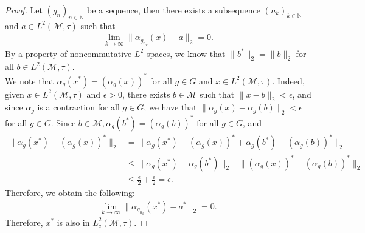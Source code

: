 \documentclass[11pt]{amsart}
\theoremstyle{definition}
\theoremstyle{myremark}
\numberwithin{equation}{section}
\newcommand{\CM}{\mathcal{M}}
\begin{document}
\begin{proof}
Let $(g_{n})_{n\in \mathbb{N}}$ be a sequence, then there exists a subsequence $(n_k)_{k\in \mathbb{N}}$ and $a\in L^{2}(\mathcal{M},\tau)$ such that 
\begin{align*}
    \lim_{k \rightarrow \infty}\|\alpha_{g_{n_k}}(x)-a\|_{2}=0.
\end{align*}
By a property of noncommutative $L^{2}$-spaces, we know that $\|b^{*}\|_{2}=\|b\|_{2}$ for all $b \in L^{2}(\mathcal{M},\tau)$.\\
We note that $\alpha_{g}(x^{*})=(\alpha_{g}(x))^{*}$ for all $g \in G \text{ and } x\in L^{2}(\CM,\tau)$. Indeed, given $x \in L^{2}(\mathcal{M},\tau)$ and $\epsilon > 0$, there exists $b \in \CM$ such that $\|x-b\|_{2}<\epsilon$, and since $\alpha_{g}$ is a contraction for all $g \in G$, we have that $\|\alpha_g(x)-\alpha_{g}(b)\|_{2}<\epsilon$ for all $g 
\in G$. Since $b \in \CM,\alpha_{g}(b^{*})=(\alpha_{g}(b))^{*}$ for all $g \in G$, and 
\begin{align*}
    \|\alpha_{g}(x^{*})-(\alpha_{g}(x))^{*}\|_{2}&=\|\alpha_{g}(x^{*})-(\alpha_{g}(x))^{*}+\alpha_{g}(b^{*})-(\alpha_{g}(b))^{*}\|_{2}\\
    &\leq\|\alpha_{g}(x^{*})-\alpha_{g}(b^{*})\|_{2}+\|(\alpha_{g}(x))^{*}-(\alpha_{g}(b))^{*}\|_{2}\\
    &\leq \frac{\epsilon}{2}+\frac{\epsilon}{2}=\epsilon.
    \end{align*}
 Therefore, we obtain the following:
\begin{align*}
    \lim_{k \rightarrow \infty}\|\alpha_{g_{n_k}}(x^{*})-a^{*}\|_{2}=0.
\end{align*}
Therefore, $x^{*}$ is also in $L^{2}_{c}(\CM, \tau)$. 
 
\end{proof}
\end{document}
